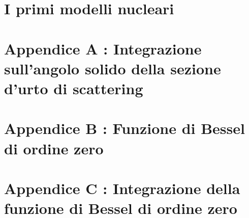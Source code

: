 \documentclass{tufte-book} %
\theoremstyle{definition}
\theoremstyle{theorem}
\theoremstyle{plain}
\theoremstyle{remark}
\theoremstyle{remark}
\begin{document}
\chapter{I primi modelli nucleari}\label{ch:modelli-nucleari}

        
\appendix
\chapter{Appendice A : Integrazione sull'angolo solido della sezione d'urto di scattering}
\label{ch:integrazione-sezione-urto-angolo-solido}
 

\chapter{Appendice B : Funzione di Bessel di ordine zero}
\label{ch:funzione-bessel-zero}


\chapter{Appendice C : Integrazione della funzione di Bessel di ordine zero}
\label{ch:integrazione-bessel-zero}



\mainmatter


\backmatter




%
\end{document}
